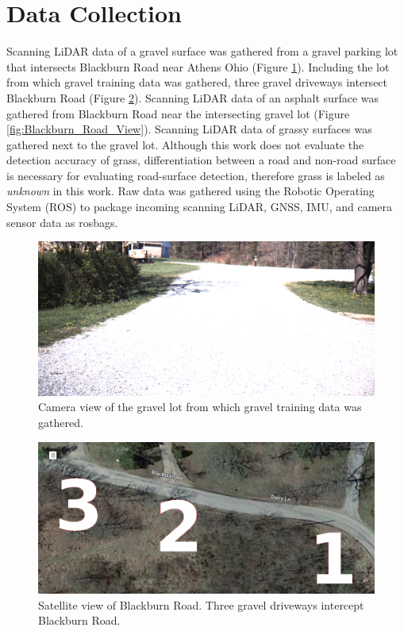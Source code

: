 \documentclass[numbered,pdftex]{ohio-etd}
\begin{document}
{{	} %
	
	\section{Data Collection}{
		
		{Scanning LiDAR data of a gravel surface was gathered from a gravel parking lot that intersects Blackburn Road near Athens Ohio (Figure \ref{fig:gravel_training_lot}). Including the lot from which gravel training data was gathered, three gravel driveways intersect Blackburn Road (Figure \ref{fig:three_driveways_sat}). Scanning LiDAR data of an asphalt surface was gathered from Blackburn Road near the intersecting gravel lot (Figure \ref{fig:Blackburn_Road_View}). Scanning LiDAR data of grassy surfaces was gathered next to the gravel lot. Although this work does not evaluate the detection accuracy of grass, differentiation between a road and non-road surface is necessary for evaluating road-surface detection, therefore grass is labeled as \textit{unknown} in this work. Raw data was gathered using the Robotic Operating System (ROS) to package incoming scanning LiDAR, GNSS, IMU, and camera sensor data as rosbags.}
		
		\begin{figure}[H]
			\centering
			\includegraphics[width=0.75\linewidth]{Defense_Images/gravel_training_lot}
			\caption[Gravel Training Lot]{Camera view of the gravel lot from which gravel training data was gathered.}
			\label{fig:gravel_training_lot}
		\end{figure}
		
		\begin{figure}[H]
			\centering
			\includegraphics[width=0.75\linewidth]{Defense_Images/three_driveways_sat}
			\caption[Satellite View of Blackburn Road]{Satellite view of Blackburn Road. Three gravel driveways intercept Blackburn Road. }
			\label{fig:three_driveways_sat}
		\end{figure}
		
}}
\end{document}
